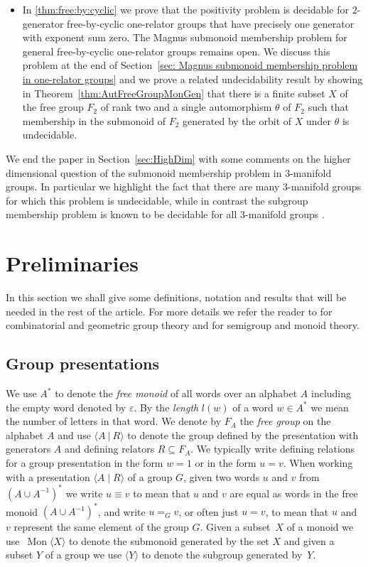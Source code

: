\documentclass[11pt]{amsart}
\newcommand{\Mgen}[1]{\operatorname{Mon}\bigl\langle #1 \bigr\rangle}
\newcommand{\Ggen}[1]{\bigl\langle #1 \bigr\rangle}
\newcommand{\Gpres}[2]{\bigl\langle #1\:|\:#2 \bigr\rangle}
\theoremstyle{plain}
\theoremstyle{definition}
\begin{document}
\begin{itemize}
\item In \cref{thm:free:by:cyclic} we prove that the positivity problem is decidable for $2$-generator free-by-cyclic one-relator groups that have precisely one generator with exponent sum zero.     
The Magnus submonoid membership problem for general free-by-cyclic one-relator groups remains open. We discuss this problem at the end of Section~\ref{sec: Magnus submonoid membership problem in one-relator groups} and we prove a related undecidability result by showing in Theorem~\ref{thm:AutFreeGroupMonGen} that there is a finite subset $X$ of the free group $F_2$ of rank two and a single automorphism $\theta$ of $F_2$ such that membership in the submonoid of $F_2$ generated by the orbit of $X$ under $\theta$ is undecidable. 
\end{itemize}
We end the paper in Section~\ref{sec:HighDim} with some comments on the higher dimensional question of the submonoid membership problem in $3$-manifold groups. In particular we highlight the fact that there are many $3$-manifold groups for which this problem is undecidable, while in contrast the subgroup membership problem is known to be decidable for all $3$-manifold groups \cite{friedl2016membership}. 









\section{Preliminaries}\label{Sec2-Preliminaries}
In this section we shall give some definitions, notation and results that will be needed in the rest of the article.    
For more details we refer the reader to 
\cite{magnus1966karrass, lyndon1977combinatorial} for combinatorial and geometric group theory and \cite{howie1995fundamentals} for semigroup and monoid theory. 


\subsection{Group presentations}
We use $A^*$ to denote the \emph{free monoid} of all words over an alphabet $A$ including the empty word denoted by $\varepsilon$. By the \emph{length} $l(w)$ of a word $w \in A^*$ we mean the number of letters in that word. We denote by $F_A$ the \emph{free group} on the alphabet $A$ and use $\Gpres{A}{R}$ to denote the group defined by the presentation with generators $A$ and defining relators $R \subseteq F_A$. 
We typically write defining relations for a group presentation in the form $w=1$ or in the form $u=v$. 
When working with a presentation $\langle A \mid R \rangle$ of a group $G$, given two words $u$ and $v$ from $(A \cup A^{-1})^*$ we write $u \equiv v$ to mean that $u$ and $v$ are equal as words in the free monoid $(A \cup A^{-1})^*$, and write $u =_G v$, or often just $u=v$, to mean that $u$ and $v$ represent the same element of the group $G$. Given a subset~$X$ of a monoid we use~$\Mgen{X}$ to denote the submonoid generated by the set $X$ and given a subset $Y$ of a group we use $\Ggen{Y}$ to denote the subgroup generated by~$Y$.  
\end{document}
